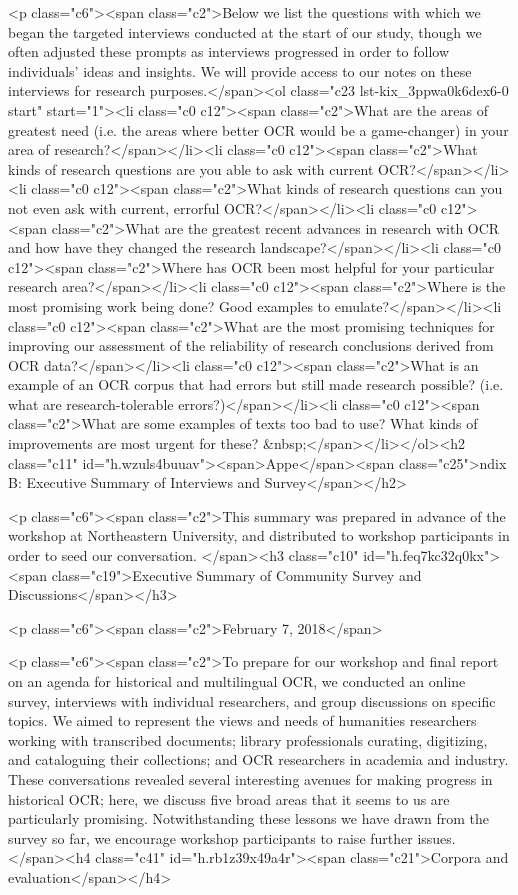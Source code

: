 \documentclass[twoside,11pt]{report}
\begin{document}
<p class="c6"><span class="c2">Below we list the questions with which we began the targeted interviews conducted at the start of our study, though we often adjusted these prompts as interviews progressed in order to follow individuals' ideas and insights. We will provide access to our notes on these interviews for research purposes.</span><ol class="c23 lst-kix_3ppwa0k6dex6-0 start" start="1"><li class="c0 c12"><span class="c2">What are the areas of greatest need (i.e. the areas where better OCR would be a game-changer) in your area of research?</span></li><li class="c0 c12"><span class="c2">What kinds of research questions are you able to ask with current OCR?</span></li><li class="c0 c12"><span class="c2">What kinds of research questions can you not even ask with current, errorful OCR?</span></li><li class="c0 c12"><span class="c2">What are the greatest recent advances in research with OCR and how have they changed the research landscape?</span></li><li class="c0 c12"><span class="c2">Where has OCR been most helpful for your particular research area?</span></li><li class="c0 c12"><span class="c2">Where is the most promising work being done? Good examples to emulate?</span></li><li class="c0 c12"><span class="c2">What are the most promising techniques for improving our assessment of the reliability of research conclusions derived from OCR data?</span></li><li class="c0 c12"><span class="c2">What is an example of an OCR corpus that had errors but still made research possible? (i.e. what are research-tolerable errors?)</span></li><li class="c0 c12"><span class="c2">What are some examples of texts too bad to use? What kinds of improvements are most urgent for these? &nbsp;</span></li></ol><h2 class="c11" id="h.wzuls4buuav"><span>Appe</span><span class="c25">ndix B: Executive Summary of Interviews and Survey</span></h2>

<p class="c6"><span class="c2">This summary was prepared in advance of the workshop at Northeastern University, and distributed to workshop participants in order to seed our conversation. </span><h3 class="c10" id="h.feq7kc32q0kx"><span class="c19">Executive Summary of Community Survey and Discussions</span></h3>

<p class="c6"><span class="c2">February 7, 2018</span>

<p class="c6"><span class="c2">To prepare for our workshop and final report on an agenda for historical and multilingual OCR, we conducted an online survey, interviews with individual researchers, and group discussions on specific topics. We aimed to represent the views and needs of humanities researchers working with transcribed documents; library professionals curating, digitizing, and cataloguing their collections; and OCR researchers in academia and industry. These conversations revealed several interesting avenues for making progress in historical OCR; here, we discuss five broad areas that it seems to us are particularly promising. Notwithstanding these lessons we have drawn from the survey so far, we encourage workshop participants to raise further issues.</span><h4 class="c41" id="h.rb1z39x49a4r"><span class="c21">Corpora and evaluation</span></h4>
\end{document}

